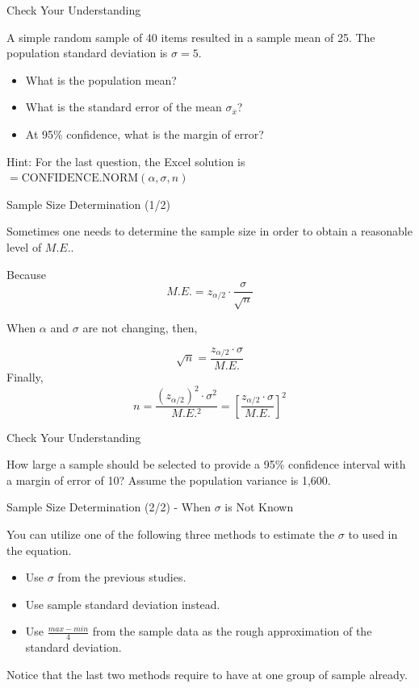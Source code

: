 \documentclass{beamer}
\begin{document}
\begin{frame}{Check Your Understanding}

A simple random sample of 40 items resulted in a sample mean of 25. The population standard deviation is $\sigma = 5$. 
\begin{itemize}
\item What is the population mean? 
\item What is the standard error of the mean $\sigma_{\bar{x}}$? 
\item At 95\% confidence, what is the margin of error? 
\end{itemize}

\vspace{0.3 cm}
Hint: For the last question, the Excel solution is $ =\text{CONFIDENCE.NORM}(\alpha, \sigma, n)$

\end{frame}





\begin{frame}{Sample Size Determination (1/2)}

Sometimes one needs to determine the sample size in order to obtain a reasonable level of $M.E.$.

Because 
$$ M.E. = z_{\alpha/2} \cdot \frac{\sigma}{\sqrt{n}} $$

When $\alpha$ and $\sigma$ are not changing, then, 

$$ \sqrt{n} = \frac{z_{\alpha/2}\cdot \sigma}{M.E.} $$
Finally, 
$$ n = \frac{(z_{\alpha/2})^2\cdot \sigma^2}{M.E.^2} = \left[ \frac{z_{\alpha/2}\cdot \sigma}{M.E.}   \right]^2  $$

\end{frame}

\begin{frame}{Check Your Understanding}

How large a sample should be selected to provide a 95\% confidence interval with a margin of error of 10? Assume the population variance is 1,600. 


\end{frame}



\begin{frame}{Sample Size Determination (2/2) - When $\sigma$ is Not Known} 

You can utilize one of the following three methods to estimate the $\sigma$ to used in the equation. 

\begin{itemize}
\item Use $\sigma$ from the previous studies.
\item Use sample standard deviation instead.
\item Use $\frac{max-min}{4}$ from the sample data as the rough approximation of the standard deviation.
\end{itemize}

Notice that the last two methods require to have at one group of sample already. 


\end{frame}
\end{document}
